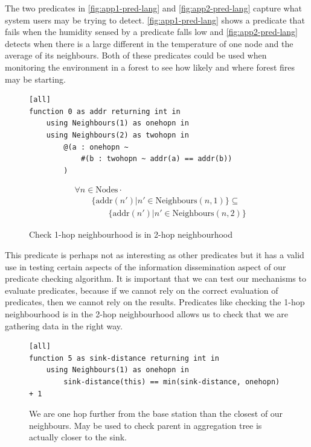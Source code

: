 The two predicates in \autoref{fig:app1-pred-lang} and \autoref{fig:app2-pred-lang} capture what system users may be trying to detect. \autoref{fig:app1-pred-lang} shows a predicate that fails when the humidity sensed by a predicate falls low and \autoref{fig:app2-pred-lang} detects when there is a large different in the temperature of one node and the average of its neighbours. Both of these predicates could be used when monitoring the environment in a forest to see how likely and where forest fires may be starting. 


\begin{figure}[H]
\begin{minipage}{.5\linewidth}
\begin{lstlisting}[language=Hoppy]
[all]
function 0 as addr returning int in
    using Neighbours(1) as onehopn in
    using Neighbours(2) as twohopn in
        @(a : onehopn ~
            #(b : twohopn ~ addr(a) == addr(b))
        )
\end{lstlisting}
\end{minipage}%
\begin{minipage}{.5\linewidth}
\begin{align*}
&				\forall n \in \text{Nodes} \cdot \\
& \hspace{2em}		\{\text{addr}(n') | n' \in \text{Neighbours}(n, 1)\} \subseteq \\
& \hspace{4em}			\{\text{addr}(n') | n' \in \text{Neighbours}(n, 2)\}
\end{align*}
\end{minipage}
\caption{Check 1-hop neighbourhood is in 2-hop neighbourhood}
\end{figure}

This predicate is perhaps not as interesting as other predicates but it has a valid use in testing certain aspects of the information dissemination aspect of our predicate checking algorithm. It is important that we can test our mechanisms to evaluate predicates, because if we cannot rely on the correct evaluation of predicates, then we cannot rely on the results. Predicates like checking the 1-hop neighbourhood is in the 2-hop neighbourhood allows us to check that we are gathering data in the right way.


\begin{figure}[H]
\begin{lstlisting}[language=Hoppy]
[all]
function 5 as sink-distance returning int in
    using Neighbours(1) as onehopn in
        sink-distance(this) == min(sink-distance, onehopn) + 1
\end{lstlisting}
\caption{We are one hop further from the base station than the closest of our neighbours. May be used to check parent in aggregation tree is actually closer to the sink.}
\label{fig:tree-agg-parent-hops-pred-lang}
\end{figure}

